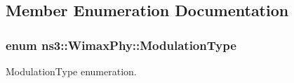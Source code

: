 \subsection{Member Enumeration Documentation}
\subsubsection[{\texorpdfstring{Modulation\+Type}{ModulationType}}]{\setlength{\rightskip}{0pt plus 5cm}enum {\bf ns3\+::\+Wimax\+Phy\+::\+Modulation\+Type}}\hypertarget{classns3_1_1WimaxPhy_a044c5d8a48ca992c39c2a946f6e755fa}{}\label{classns3_1_1WimaxPhy_a044c5d8a48ca992c39c2a946f6e755fa}


Modulation\+Type enumeration. 

